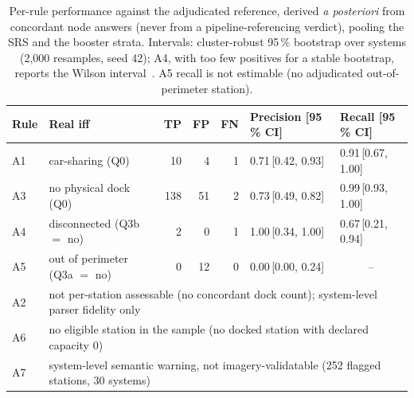 \documentclass[11pt,a4paper]{article}
\begin{document}
\begin{table}[!htbp]
\centering
\caption{Per-rule performance against the adjudicated reference, derived
\emph{a posteriori} from concordant node answers (never from a
pipeline-referencing verdict), pooling the SRS and the booster strata.
Intervals: cluster-robust 95\,\% bootstrap over systems (2{,}000
resamples, seed 42); A4, with too few positives for a stable bootstrap,
reports the Wilson interval~\cite{Wilson1927Interval}. A5 recall is not
estimable (no adjudicated out-of-perimeter station).}
\label{tab:perrule}
\small
\begin{tabular}{@{}llrrrll@{}}
\toprule
\textbf{Rule} & \textbf{Real iff} & \textbf{TP} & \textbf{FP} & \textbf{FN}
& \textbf{Precision [95\,\% CI]} & \textbf{Recall [95\,\% CI]}\\
\midrule
A1 & car-sharing (Q0)          & 10 & 4 & 1 & 0.71\,[0.42, 0.93] & 0.91\,[0.67, 1.00]\\
A3 & no physical dock (Q0)     & 138 & 51 & 2 & 0.73\,[0.49, 0.82] & 0.99\,[0.93, 1.00]\\
A4 & disconnected (Q3b $=$ no) & 2 & 0 & 1 & 1.00\,[0.34, 1.00] & 0.67\,[0.21, 0.94]\\
A5 & out of perimeter (Q3a $=$ no) & 0 & 12 & 0 & 0.00\,[0.00, 0.24] & \multicolumn{1}{c}{--}\\
\midrule
A2 & \multicolumn{6}{l}{not per-station assessable (no concordant dock count); system-level parser fidelity only}\\
A6 & \multicolumn{6}{l}{no eligible station in the sample (no docked station with declared capacity $0$)}\\
A7 & \multicolumn{6}{l}{system-level semantic warning, not imagery-validatable (252 flagged stations, 30 systems)}\\
\bottomrule
\end{tabular}
\end{table}
\end{document}
